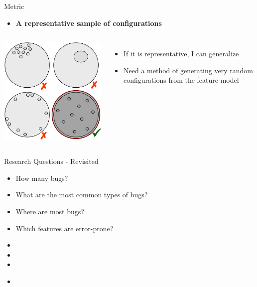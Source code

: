 \documentclass[mathserif,serif]{beamer}
\newenvironment{items}{
\begin{itemize}
  \setlength{\itemsep}{0pt}
  \setlength{\parskip}{7pt}
  \setlength{\parsep}{4pt}
}{\end{itemize}}
\begin{document}
\begin{frame}[t]{Metric}

    \begin{items}
        \item \textbf{A representative sample of configurations}
    \end{items}

    \begin{columns}[T]
        \includegraphics[scale=.5]{sample.png}
        \pause
        \begin{items}
            \item If it is representative, I can generalize
            \pause
            \item Need a method of generating very random configurations from the 
                        feature model
        \end{items}
    \end{columns}
\end{frame}

\begin{frame}[t]{Research Questions - Revisited}

    \begin{items}
        \item How many bugs?
        \item What are the most common types of bugs?
        \item Where are most bugs?
        \item Which features are error-prone?
        \pause
        \item \color{red}{... Additional questions?}
        \item \color{red}{... Prioritization?}
        \item \color{red}{... Take a few minutes to brainstorm about it}
    \end{items}
    
    \begin{items}
        \item \color{gray}{(One-disabled vs. randconfig)}
    \end{items}
\end{frame}
\end{document}
